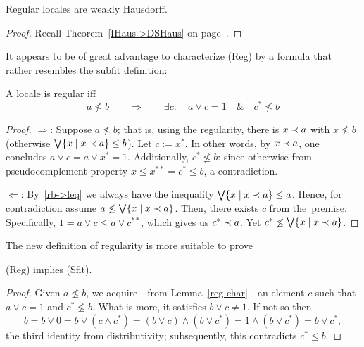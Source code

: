 \begin{cor}
  Regular locales are weakly Hausdorff.
\end{cor}
\begin{proof}
  Recall Theorem~\ref{IHaus->DSHaus} on page~\pageref{IHaus->DSHaus}\thinspace.
\end{proof}

It appears to be of great advantage to characterize (Reg) by a formula
that rather resembles the subfit definition:
\begin{lem} \label{reg-char}
  A locale is regular iff
  \[
    a \not\le b \qquad \Rightarrow \qquad \exists c: \quad a \vee c = 1 \quad
    \& \quad c^* \not\leq b
  \]
\end{lem}
\begin{proof}
  $\Rightarrow$:
  Suppose $a \not\le b$;
  that is, using the regularity, there is $x \prec a$ with $x \not\le b$ (otherwise
  $\bigvee \{x \mid x \prec a\} \le b$).
  Let $c := x^*$.
  In other words, by $x \prec a$, one concludes $a \vee c = a \vee x^* = 1$.
  Additionally, $c^* \not\le b$: since otherwise from pseudocomplement property
  $x \le x^{**} = c^* \le b$, a contradiction.

  $\Leftarrow$:
  By~\ref{rb->leq} we always have the inequality $\bigvee \{x \mid x \prec a\} \le
  a$.
  Hence, for contradiction assume $a \not\le \bigvee \{x \mid x \prec a\}$.
  Then, there exists $c$ from the~premise.
  Specifically, $1 = a \vee c \le a \vee c^{**}$, which gives us $c^* \prec a$.
  Yet $c^* \not\le \bigvee \{x \mid x \prec a\}$.
\end{proof}

The new definition of regularity is more suitable to prove
\begin{thm}
  (Reg) implies (Sfit).
\end{thm}
\begin{proof}
  Given $a \not\le b$, we acquire---from Lemma~\ref{reg-char}\thinspace---an
  element $c$ such that $a \vee c = 1$ and $c^* \not\le b$.
  What is more, it satisfies $b \vee c \ne 1$.
  If not so then
  \[
    b = b \vee 0 = b \vee (c \wedge c^*) = (b \vee c) \wedge (b \vee c^*) = 1
    \wedge (b \vee c^*) = b \vee c^*,
  \]
  the third identity from distributivity; subsequently, this contradicts $c^*
  \le b$.
\end{proof}

